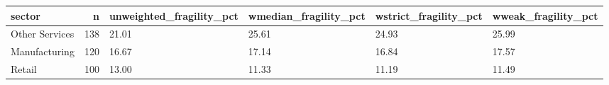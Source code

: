 \begin{tabular}{lrllll}
\toprule
sector & n & unweighted\_fragility\_pct & wmedian\_fragility\_pct & wstrict\_fragility\_pct & wweak\_fragility\_pct \\
\midrule
Other Services & 138 & 21.01 & 25.61 & 24.93 & 25.99 \\
Manufacturing & 120 & 16.67 & 17.14 & 16.84 & 17.57 \\
Retail & 100 & 13.00 & 11.33 & 11.19 & 11.49 \\
\bottomrule
\end{tabular}
